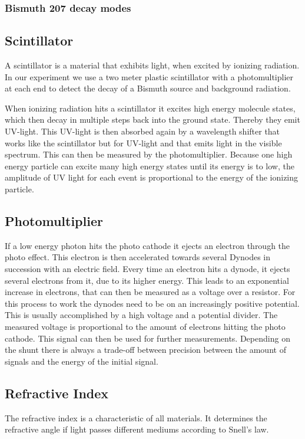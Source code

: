 \documentclass[]{article}
\begin{document}
\subsubsection{Bismuth 207 decay modes}


\subsection{Scintillator}\label{scintillator}
A scintillator is a material that exhibits light, when excited by ionizing radiation. In our experiment we use a two meter plastic scintillator with a photomultiplier at each end to detect the decay of a Bismuth source and background radiation.

When ionizing radiation hits a scintillator it excites high energy molecule states, which then decay in multiple steps back into the ground state. Thereby they emit UV-light. This UV-light is then absorbed again by a wavelength shifter that works like the scintillator but for UV-light and that emits light in the visible spectrum. This can then be measured by the photomultiplier. Because one high energy particle can excite many high energy states until its energy is to low, the amplitude of UV light for each event is proportional to the energy of the ionizing particle.
\subsection{Photomultiplier}
If a low energy photon hits the photo cathode it ejects an electron through the photo effect. This electron is then accelerated towards several Dynodes in succession with an electric field. Every time an electron hits a dynode, it ejects several electrons from it, due to its higher energy. This leads to an exponential increase in electrons, that can then be measured as a voltage over a resistor. For this process to work the dynodes need to be on an increasingly positive potential. This is usually accomplished by a high voltage and a potential divider. 
The measured voltage is proportional to the amount of electrons hitting the photo cathode. This signal can then be used for further measurements. Depending on the shunt there is always a trade-off between precision between the amount of signals and the energy of the initial signal. 
\subsection{Refractive Index}\label{refrac index}
The refractive index is a characteristic of all materials. It determines the refractive angle if light passes different mediums according to Snell's law. 
\end{document}
